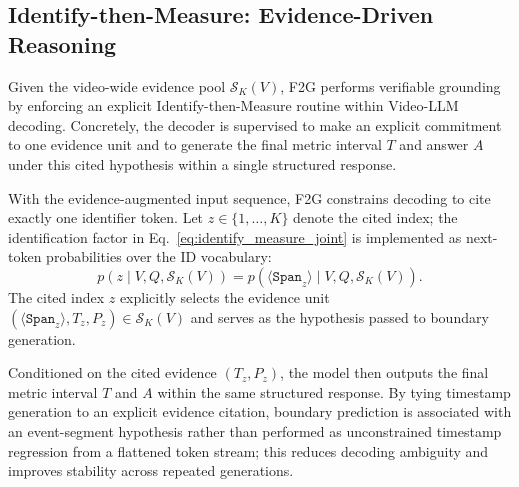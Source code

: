 \documentclass{article}
\theoremstyle{plain}
\theoremstyle{definition}
\theoremstyle{remark}
\begin{document}
\subsection{Identify-then-Measure: Evidence-Driven Reasoning}
\label{sec:reasoning}
Given the video-wide evidence pool $\mathcal{S}_K(V)$, F2G performs verifiable grounding by enforcing an explicit Identify-then-Measure routine within Video-LLM decoding.
Concretely, the decoder is supervised to make an explicit commitment to one evidence unit and to generate the final metric interval $T$ and answer $A$ under this cited hypothesis within a single structured response.

With the evidence-augmented input sequence, F2G constrains decoding to cite exactly one identifier token.
Let $z\in\{1,\ldots,K\}$ denote the cited index; the identification factor in Eq.~\ref{eq:identify_measure_joint} is implemented as next-token probabilities over the ID vocabulary:
\begin{equation}
p\!\left(z \mid V,Q,\mathcal{S}_K(V)\right)
=
p\!\left(\langle\texttt{Span}_z\rangle \mid V,Q,\mathcal{S}_K(V)\right).
\label{eq:identify_prob}
\end{equation}
The cited index $z$ explicitly selects the evidence unit $(\langle\texttt{Span}_z\rangle, T_z, P_z)\in\mathcal{S}_K(V)$ and serves as the hypothesis passed to boundary generation.

Conditioned on the cited evidence $(T_z,P_z)$, the model then outputs the final metric interval $T$ and $A$ within the same structured response.
By tying timestamp generation to an explicit evidence citation, boundary prediction is associated with an event-segment hypothesis rather than performed as unconstrained timestamp regression from a flattened token stream; this reduces decoding ambiguity and improves stability across repeated generations.
\end{document}
